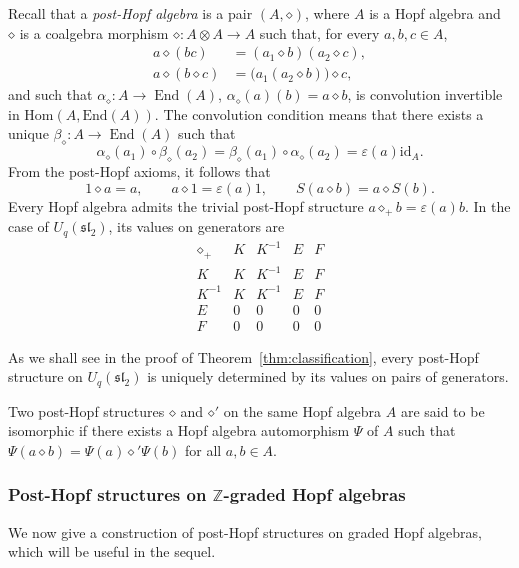 \documentclass[11pt,english]{article}
\newcommand{\id}{\mathrm{id}}
\newcommand{\eps}{\varepsilon}
\newcommand{\act}{\mathbin{\diamond}}
\theoremstyle{definition}
\begin{document}
Recall that a \emph{post-Hopf
algebra} is a pair $(A,\act)$, where $A$ is a Hopf algebra and $\act$ is a
coalgebra morphism $\act:A\otimes A\to A$ such that, for every $a,b,c\in A$,
\begin{align}
a\act(bc)&=(a_1\act b)(a_2\act c),
\label{eq:PH1}\\
a\act(b\act c)&=\bigl(a_1(a_2\act b)\bigr)\act c,
\label{eq:PH2}
\end{align}
and such that $\alpha_{\act}:A\to\operatorname{End}(A)$,
$\alpha_{\act}(a)(b)=a\act b$, is convolution invertible in $\mathrm{Hom}(A, \mathrm{End}(A))$. 
The convolution condition means that there exists a unique
$\beta_{\act}:A\to\operatorname{End}(A)$ such that
\begin{equation}\label{eq:beta}
\alpha_{\act}(a_1)\circ\beta_{\act}(a_2)
=\beta_{\act}(a_1)\circ\alpha_{\act}(a_2)
=\eps(a)\id_A.
\end{equation}
From the post-Hopf axioms, it follows that 
\begin{equation}\label{eq:norm}
1\act a=a,\qquad a\act1=\eps(a)1,\qquad
S(a\act b)=a\act S(b).
\end{equation}
Every Hopf algebra admits the trivial post-Hopf structure  $a\act_+ b=\eps(a)b$. In the case of $U_q(\mathfrak{sl}_2)$, its values on generators are 
\[
\begin{array}{c|cccc}
\act_+ & K & K^{-1} & E & F\\ \hline
K      & K & K^{-1} & E & F\\
K^{-1} & K & K^{-1} & E & F\\
E      & 0 & 0 & 0 & 0\\
F      & 0 & 0 & 0 & 0
\end{array}
\]

As we shall see in the proof of Theorem~\ref{thm:classification},
every post-Hopf structure on $U_q(\mathfrak{sl}_2)$
is uniquely determined by its values on pairs
of generators.

Two post-Hopf structures $\act$ and $\act'$ on the same
Hopf algebra $A$ are said to be isomorphic if there exists
a Hopf algebra automorphism $\Psi$ of $A$ such that $\Psi(a\act b)=\Psi(a)\act'\Psi(b)$
for all $a,b\in A$.

\subsubsection{Post-Hopf structures on $\mathbb{Z}$-graded Hopf algebras}

We now give a construction of post-Hopf
structures on graded Hopf algebras, which will be useful in the
sequel.
\end{document}
